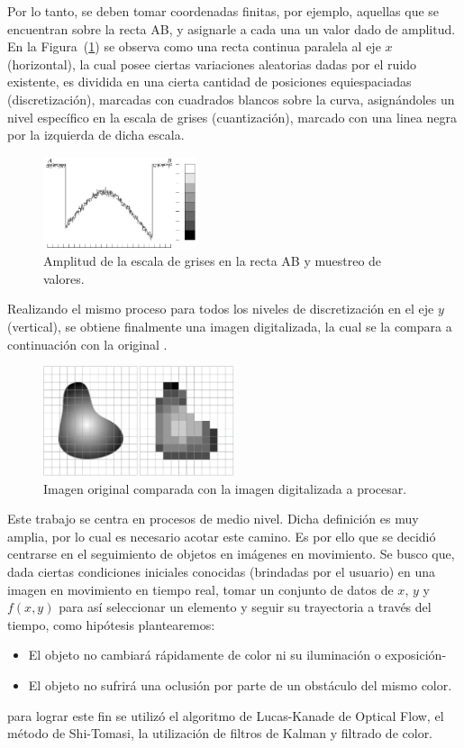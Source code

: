 Por lo tanto, se deben tomar coordenadas finitas, por ejemplo, aquellas que se encuentran sobre la recta AB, y asignarle a cada una un valor dado de amplitud. En la Figura~(\ref{fig:disc2}) se observa como una recta continua paralela al eje $x$ (horizontal), la cual posee ciertas variaciones aleatorias dadas por el ruido existente, es dividida en una cierta cantidad de posiciones equiespaciadas (discretización), marcadas con cuadrados blancos sobre la curva, asignándoles un nivel específico en la escala de grises (cuantización), marcado con una linea negra por la izquierda de dicha escala.
\begin{figure}[H]
\centering
	\includegraphics[width=0.4\textwidth]{Imagenes/Digitalizacion_2.png}
	\caption{Amplitud de la escala de grises en la recta AB y muestreo de valores.}
	\label{fig:disc2}
\end{figure}

Realizando el mismo proceso para todos los niveles de discretización en el eje $y$ (vertical), se obtiene finalmente una imagen digitalizada, la cual se la compara a continuación con la original \cite{ref:digit1}.
\begin{figure}[H]
\centering
	\includegraphics[width=0.5\textwidth]{Imagenes/Digitalizacion_3.png}
	\caption{Imagen original comparada con la imagen digitalizada a procesar.}
	\label{fig:disc3}
\end{figure}

Este trabajo se centra en procesos de medio nivel. Dicha definición es muy amplia, por lo cual es necesario acotar este camino. Es por ello que se decidió centrarse en el seguimiento de objetos en imágenes en movimiento. Se busco que, dada ciertas condiciones iniciales conocidas (brindadas por el usuario) en una imagen en movimiento en tiempo real, tomar un conjunto de datos de $x$, $y$ y $f(x,y)$ para así seleccionar un elemento y seguir su trayectoria a través del tiempo, como hipótesis plantearemos:
\begin{itemize}
\item El objeto no cambiará rápidamente de color ni su iluminación o exposición-
\item El objeto no sufrirá una oclusión por parte de un obstáculo del mismo color.
\end{itemize} para lograr este fin se utilizó el algoritmo de Lucas-Kanade de Optical Flow, el método de Shi-Tomasi, la utilización de filtros de Kalman y filtrado de color.
